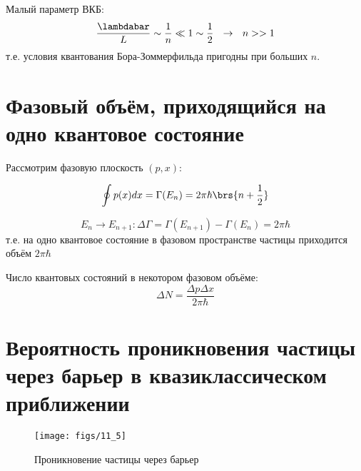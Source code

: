 Малый параметр ВКБ:
$$
\frac{\lambdabar}{L} \sim \frac{1}{n} \ll 1 \sim \frac{1}{2} ~~\rightarrow~~ n >> 1
$$
т.е. условия квантования Бора-Зоммерфильда пригодны при больших $n$.

\section{Фазовый объём, приходящийся на одно квантовое состояние}

Рассмотрим фазовую плоскость $(p,x)$:

$$
\oint p(x)dx = \Gamma(E_n) = 2\pi\hbar\brs{n+\frac{1}{2}}
$$

$$
E_n \to E_{n+1}: \boxed{\Delta\Gamma = \Gamma(E_{n+1}) - \Gamma(E_n) = 2\pi\hbar}
$$
т.е. на одно квантовое состояние в фазовом пространстве частицы приходится объём $2\pi\hbar$

Число квантовых состояний в некотором фазовом объёме:
$$
\boxed{\Delta N = \frac{\Delta p \Delta x}{2\pi\hbar}}
$$

\begin{sloppypar}
  \section{Вероятность проникновения частицы через барьер в квазиклассическом приближении}
\end{sloppypar}

\begin{figure}[h]
\centering
\texttt{[image: figs/11\_5]}
\caption{Проникновение частицы через барьер}
\label{fig:11_5}
\end{figure}


